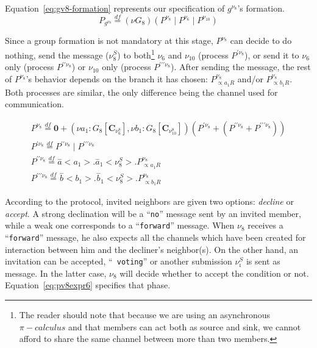 Equation~\ref{eq:gv8-formation} represents our specification of $g^{\nu_8}$'s formation.
\begin{equation}
	\label{eq:gv8-formation}
	\boxed{P_{g^{\nu_8}}\overset{df}{=}(\nu G_8)(P^{\nu_8}\mid P^{\nu_6} \mid P^{\nu_{10}})}
\end{equation}

Since a group formation is not mandatory at this stage, $P^{\nu_8}$ can decide to do nothing, send the message
($\nu_8^S$) to both\footnote{The reader should note that because we are using an asynchronous $\pi-calculus$ and that
members can act both as source and sink, we cannot afford to share the same channel between more than two members.}
$\nu_6$ and $\nu_{10}$ (process $P^{\prime\nu_8}$), or send it to $\nu_6$ only (process $P^{\prime\prime\nu_8}$) or
$\nu_{10}$ only (process $P^{\prime\prime\prime\nu_8}$). After sending the message, the rest of $P^{\nu_8}$'s behavior
depends on the branch it has chosen: $P^{\nu_8}_{\propto a_1R}$ and/or $P^{\nu_8}_{\propto b_1R}$. Both processes are
similar, the only difference being the channel used for communication.

\begin{equation} 
	\label{eq:pv8expr}
	\begin{gathered}
		P^{\nu_8} \overset{df}{=} \mathbf{0} + (\nu a_1:G_8[\mathbf{C}_{\nu_6^8}], \nu b_1:G_8[\mathbf{C}_{\nu_{10}^8}])(P^{\prime\nu_8} + (P^{\prime\prime\nu_8} + P^{\prime\prime\prime\nu_8}))\\
		P^{\prime\nu_8}\overset{df}{=}P^{\prime\prime\nu_8}\mid P^{\prime\prime\prime\nu_8}\\
		P^{\prime\prime\nu_8}\overset{df}{=}\overset{-}{a}<a_1>.\overset{-}{a}_1<\nu_8^S>.P^{\nu_8}_{\propto a_1R}	\\
		P^{\prime\prime\prime\nu_8}\overset{df}{=}\overset{-}{b}<b_1>.\overset{-}{b}_1<\nu_8^S>.P^{\nu_8}_{\propto b_1R}		
	\end{gathered}
\end{equation}

According to the protocol, invited neighbors are given two options: \emph{decline} or \emph{accept}. A strong declination
will be a ``{\tt no}'' message sent by an invited member, while a weak one corresponds to a ``{\tt forward}'' message.
When $\nu_8$ receives a ``{\tt forward}'' message, he also expects all the channels which have been created for
interaction between him and the decliner's neighbor(s). On the other hand, an invitation can be accepted, ``{\tt
voting}'' or another submission $\nu_\imath^S$ is sent as message. In the latter case, $\nu_8$ will decide whether to
accept the condition or not. Equation~\ref{eq:pv8expr6} specifies that phase.

